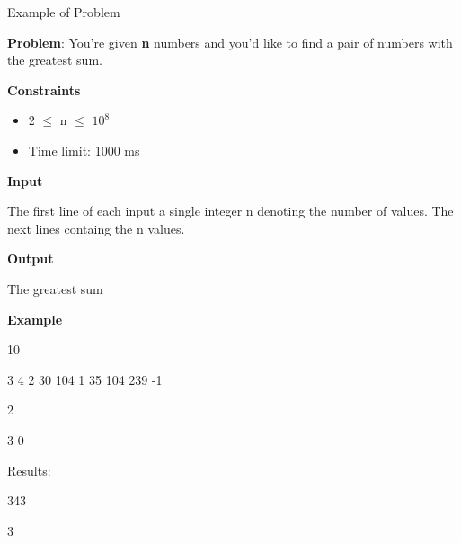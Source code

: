 \documentclass{beamer}
\begin{document}
\begin{frame}[t]{Example of Problem} \vspace{4pt}

  \begin{tiny}
  \textbf{Problem}:
  You're given \textbf{n} numbers and you'd like to find a pair of numbers with the greatest sum.

  \textbf{Constraints}
  \begin{itemize}
    \item 2 $\leq$ n $\leq$ $10^8$
    \item Time limit: 1000 ms
  \end{itemize}
  
  \textbf{Input}

  The first line of each input a single integer n denoting the number of values. The next lines containg the n values.

  \textbf{Output}

  The greatest sum
  
  \textbf{Example}

  10

  3 4 2 30 104 1 35 104 239 -1


  2

  3 0

  Results:

  343

  3

  \end{tiny}

\end{frame}
\end{document}
